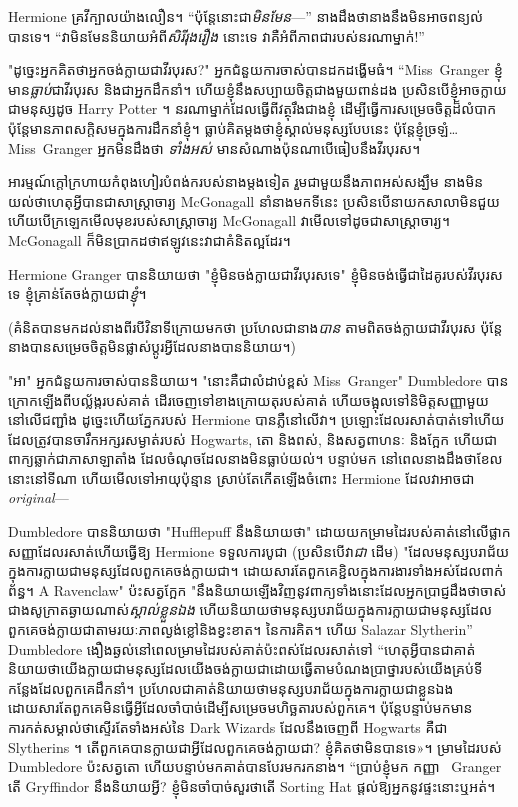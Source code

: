 {{Hermione គ្រវីក្បាលយ៉ាងលឿន។ “ប៉ុន្តែនោះជា\emph{មិនមែន}—” នាងដឹងថានាងនឹងមិនអាចពន្យល់បានទេ។ “វាមិនមែននិយាយអំពី\emph{សិរីរុងរឿង} នោះទេ វាគឺអំពីភាពជារបស់នរណាម្នាក់!”

"ដូច្នេះអ្នកគិតថាអ្នកចង់ក្លាយជាវីរបុរស?" អ្នកជំនួយការចាស់បានដកដង្ហើមធំ។ “Miss~Granger ខ្ញុំមាន\emph{ធ្លាប់}ជាវីរបុរស និងជាអ្នកដឹកនាំ។ ហើយខ្ញុំនឹងសប្បាយចិត្តជាងមួយពាន់ដង ប្រសិនបើខ្ញុំអាចក្លាយជាមនុស្សដូច Harry Potter ។ នរណាម្នាក់ដែលធ្វើពីវត្ថុរឹងជាងខ្ញុំ ដើម្បីធ្វើការសម្រេចចិត្តដ៏លំបាក ប៉ុន្តែមានភាពសក្ដិសមក្នុងការដឹកនាំខ្ញុំ។ ធ្លាប់គិតម្តងថាខ្ញុំស្គាល់មនុស្សបែបនេះ ប៉ុន្តែខ្ញុំច្រឡំ… Miss~Granger អ្នកមិនដឹងថា \emph{ទាំងអស់} មានសំណាងប៉ុនណាបើធៀបនឹងវីរបុរស។

អារម្មណ៍ក្តៅក្រហាយកំពុងហៀរបំពង់ករបស់នាងម្តងទៀត រួមជាមួយនឹងភាពអស់សង្ឃឹម នាងមិនយល់ថាហេតុអ្វីបានជាសាស្រ្តាចារ្យ McGonagall នាំនាងមកទីនេះ ប្រសិនបើនាយកសាលាមិនជួយ ហើយបើក្រឡេកមើលមុខរបស់សាស្រ្តាចារ្យ McGonagall វាមើលទៅដូចជាសាស្រ្តាចារ្យ។ McGonagall ក៏​មិន​ប្រាកដ​ថា​ឥឡូវ​នេះ​វា​ជា​គំនិត​ល្អ​ដែរ។

Hermione Granger បាននិយាយថា "ខ្ញុំមិនចង់ក្លាយជាវីរបុរសទេ" ខ្ញុំមិនចង់ធ្វើជាដៃគូរបស់វីរបុរសទេ ខ្ញុំគ្រាន់តែចង់ក្លាយជា\emph{ខ្ញុំ}។

(គំនិតបានមកដល់នាងពីរបីវិនាទីក្រោយមកថា ប្រហែលជានាង\emph{បាន} តាមពិតចង់ក្លាយជាវីរបុរស ប៉ុន្តែនាងបានសម្រេចចិត្តមិនផ្លាស់ប្តូរអ្វីដែលនាងបាននិយាយ។)

"អា" អ្នកជំនួយការចាស់បាននិយាយ។ "នោះគឺជាលំដាប់ខ្ពស់ Miss~Granger" Dumbledore បានក្រោកឡើងពីបល្ល័ង្ករបស់គាត់ ដើរចេញទៅខាងក្រោយតុរបស់គាត់ ហើយចង្អុលទៅនិមិត្តសញ្ញាមួយនៅលើជញ្ជាំង ដូច្នេះហើយភ្នែករបស់ Hermione បានភ្លឺនៅលើវា។ ប្រឡោះ​ដែល​រសាត់​បាត់​ទៅ​ហើយ ដែល​ត្រូវ​បាន​ចារឹក​អក្សរ​សម្ងាត់​របស់ Hogwarts, តោ និង​ពស់, និង​សត្វ​ពាហនៈ និង​ក្អែក ហើយ​ជា​ពាក្យ​ឆ្លាក់​ជា​ភាសា​ឡាតាំង ដែល​ចំណុច​ដែល​នាង​មិន​ធ្លាប់​យល់។ បន្ទាប់មក នៅពេលនាងដឹងថាខែលនោះនៅទីណា ហើយមើលទៅអាយុប៉ុន្មាន ស្រាប់តែកើតឡើងចំពោះ Hermione ដែលវាអាចជា \emph{original}—

Dumbledore បាននិយាយថា "Hufflepuff នឹងនិយាយថា" ដោយយកម្រាមដៃរបស់គាត់នៅលើផ្លាកសញ្ញាដែលរសាត់ហើយធ្វើឱ្យ Hermione ទទួលការបូជា (ប្រសិនបើវា\emph{ជា} ដើម) "ដែលមនុស្សបរាជ័យក្នុងការក្លាយជាមនុស្សដែលពួកគេចង់ក្លាយជា។ ដោយសារតែពួកគេខ្ជិលក្នុងការងារទាំងអស់ដែលពាក់ព័ន្ធ។ A Ravenclaw" ប៉ះសត្វក្អែក "នឹងនិយាយឡើងវិញនូវពាក្យទាំងនោះដែលអ្នកប្រាជ្ញដឹងថាចាស់ជាងសូក្រាតឆ្ងាយណាស់\emph{ស្គាល់ខ្លួនឯង} ហើយនិយាយថាមនុស្សបរាជ័យក្នុងការក្លាយជាមនុស្សដែលពួកគេចង់ក្លាយជាតាមរយៈភាពល្ងង់ខ្លៅនិងខ្វះខាត។ នៃការគិត។ ហើយ Salazar Slytherin” Dumbledore ងឿងឆ្ងល់នៅពេលម្រាមដៃរបស់គាត់ប៉ះពស់ដែលរសាត់ទៅ “ហេតុអ្វីបានជាគាត់និយាយថាយើងក្លាយជាមនុស្សដែលយើងចង់ក្លាយជាដោយធ្វើតាមបំណងប្រាថ្នារបស់យើងគ្រប់ទីកន្លែងដែលពួកគេដឹកនាំ។ ប្រហែលជាគាត់និយាយថាមនុស្សបរាជ័យក្នុងការក្លាយជាខ្លួនឯងដោយសារតែពួកគេមិនធ្វើអ្វីដែលចាំបាច់ដើម្បីសម្រេចមហិច្ឆតារបស់ពួកគេ។ ប៉ុន្តែបន្ទាប់មកមានការកត់សម្គាល់ថាស្ទើរតែទាំងអស់នៃ Dark Wizards ដែលនឹងចេញពី Hogwarts គឺជា Slytherins ។ តើពួកគេបានក្លាយជាអ្វីដែលពួកគេចង់ក្លាយជា? ខ្ញុំ​គិត​ថា​មិន​បាន​ទេ»។ ម្រាមដៃរបស់ Dumbledore ប៉ះសត្វតោ ហើយបន្ទាប់មកគាត់បានបែរមករកនាង។ “ប្រាប់ខ្ញុំមក កញ្ញា ~Granger តើ Gryffindor នឹងនិយាយអ្វី? ខ្ញុំមិនចាំបាច់សួរថាតើ Sorting Hat ផ្តល់ឱ្យអ្នកនូវផ្ទះនោះឬអត់។

}}
